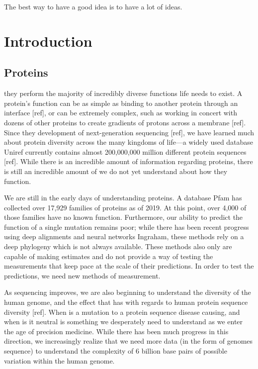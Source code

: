 \begin{savequote}[75mm]
The best way to have a good idea is to have a lot of ideas. 
\end{savequote}

\chapter{Introduction}
\label{introduction}


\section{Proteins}
 they perform the majority of incredibly diverse functions life needs to exist.  A protein's function can be as simple as binding to another protein through an interface [ref], or can be extremely complex, such as working in concert with dozens of other proteins to create gradients of protons across a membrane [ref]. Since they development of next-generation sequencing [ref], we have learned much about protein diversity across the many kingdoms of life---a widely used database Uniref currently contains almost 200,000,000 million different protein sequences [ref]. While there is an incredible amount of information regarding proteins, there is still an incredible amount of we do not yet understand about how they function. 

We are still in the early days of understanding proteins. A database Pfam \cite{Punta2012TheDatabase.} has collected over 17,929 families of proteins as of 2019\cite{El-Gebali2019The2019}. At this point, over 4,000 of those families have no known function. Furthermore, our ability to predict the function of a single mutation remains poor; while there has been recent progress using deep alignments and neural networks {Ingraham}, these methods rely on a deep phylogeny which is not always available. These methods also only are capable of making estimates and do not provide a way of testing the measurements that keep pace at the scale of their predictions. In order to test the predictions, we need new methods of measurement. 

As sequencing improves, we are also beginning to understand the diversity of the human genome, and the effect that has with regards to human protein sequence diversity [ref]. When is a mutation to a protein sequence disease causing, and when is it neutral is something we desperately need to understand as we enter the age of precision medicine. While there has been much progress in this direction, we increasingly realize that we need more data (in the form of genomes sequence) to understand the complexity of 6 billion base pairs of possible variation within the human genome. 

